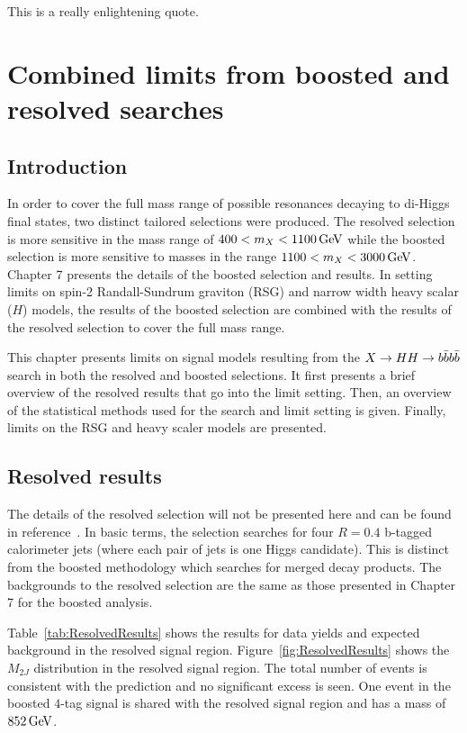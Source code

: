 \begin{savequote}[75mm]
This is a really enlightening quote. 
\end{savequote}

\chapter{Combined limits from boosted and resolved searches}
\label{chap:4bcomb}

\section{Introduction}

In order to cover the full mass range of possible resonances decaying to di-Higgs final states, two distinct tailored selections were produced. The resolved selection is more sensitive in the mass range of $400 < m_{X} < 1100 \GeV$ while the boosted selection is more sensitive to masses in the range $1100 < m_{X} < 3000 \GeV$. Chapter 7 presents the details of the boosted selection and results. In setting limits on spin-2 Randall-Sundrum graviton (RSG) and narrow width heavy scalar ($H$) models, the results of the boosted selection are combined with the results of the resolved selection to cover the full mass range.

This chapter presents limits on signal models resulting from the $X\to HH \to b\bar{b}b\bar{b}$ search in both the resolved and boosted selections. It first presents a brief overview of the resolved results that go into the limit setting. Then, an overview of the statistical methods used for the search and limit setting is given. Finally, limits on the RSG and heavy scaler models are presented. 

\section{Resolved results}

The details of the resolved selection will not be presented here and can be found in reference~\cite{4bconf}. In basic terms, the selection searches for four $R = 0.4$ b-tagged calorimeter jets (where each pair of jets is one Higgs candidate). This is distinct from the boosted methodology which searches for merged decay products. The backgrounds to the resolved selection are the same as those presented in Chapter 7 for the boosted analysis. 

Table~\ref{tab:ResolvedResults} shows the results for data yields and expected background in the resolved signal region. Figure~\ref{fig:ResolvedResults} shows the $M_{2J}$ distribution in the resolved signal region. The total number of events is consistent with the prediction and no significant excess is seen. One event in the boosted $4$-tag signal is shared with the resolved signal region and has a mass of $852 \GeV$. 

